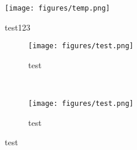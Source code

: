\subsectio
\begin{figure}[h]
    \centering
    \texttt{[image: figures/temp.png]}
    \caption{test123}
    \label{fig:test}
\end{figure}


\begin{figure}[ht] 
  \begin{subfigure}[b]{0.90\linewidth}
    \centering
    \texttt{[image: figures/test.png]} 
    \caption{test} 
    \label{fig:test} 
    \vspace{4ex}
  \end{subfigure}\\%
  \begin{subfigure}[b]{0.90\linewidth}
    \centering
    \texttt{[image: figures/test.png]} 
    \caption{test} 
    \label{fig:} 
    \vspace{4ex}
  \end{subfigure} 
  \caption{test}
  \label{fig:curves} 
\end{figure}
